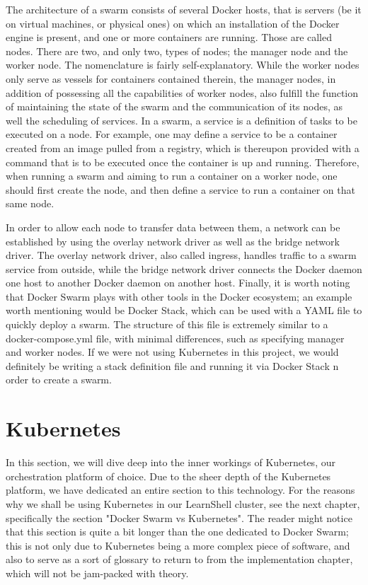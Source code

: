 \documentclass[thesis=B,english]{FITthesis}[2019/12/23]
\begin{document}
The architecture of a swarm consists of several Docker hosts, that is servers (be it on virtual machines, or physical ones) on which an installation of the Docker engine is present, and one or more containers are running. \cite{swarm-key-concepts} Those are called nodes. There are two, and only two, types of nodes; the manager node and the worker node. The nomenclature is fairly self-explanatory. While the worker nodes only serve as vessels for containers contained therein, the manager nodes, in addition of possessing all the capabilities of worker nodes, also fulfill the function of maintaining the state of the swarm and the communication of its nodes, as well the scheduling of services. In a swarm, a service is a definition of tasks to be executed on a node. \cite{swarm-nodes} For example, one may define a service to be a container created from an image pulled from a registry, which is thereupon provided with a command that is to be executed once the container is up and running. Therefore, when running a swarm and aiming to run a container on a worker node, one should first create the node, and then define a service to run a container on that same node.

In order to allow each node to transfer data between them, a network can be established by using the overlay network driver as well as the bridge network driver. The overlay network driver, also called ingress, handles traffic to a swarm service from outside, while the bridge network driver connects the Docker daemon one host to another Docker daemon on another host. 
Finally, it is worth noting that Docker Swarm plays with other tools in the Docker ecosystem; an example worth mentioning would be Docker Stack, which can be used with a YAML file to quickly deploy a swarm. The structure of this file is extremely similar to a docker-compose.yml file, with minimal differences, such as specifying manager and worker nodes. If we were not using Kubernetes in this project, we would definitely be writing a stack definition file and running it via Docker Stack n order to create a swarm. 

\section{Kubernetes}

In this section, we will dive deep into the inner workings of Kubernetes, our orchestration platform of choice. Due to the sheer depth of the Kubernetes platform, we have dedicated an entire section to this technology. For the reasons why we shall be using Kubernetes in our LearnShell cluster, see the next chapter, specifically the section "Docker Swarm vs Kubernetes". The reader might notice that this section is quite a bit longer than the one dedicated to Docker Swarm; this is not only due to Kubernetes being a more complex piece of software, and also to serve as a sort of glossary to return to from the implementation chapter, which will not be jam-packed with theory.
\end{document}
